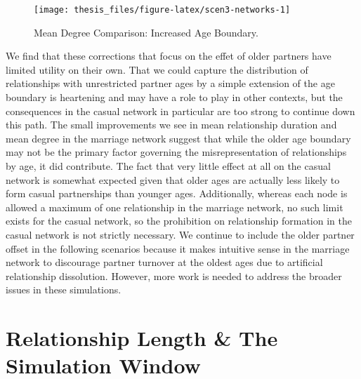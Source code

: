 \documentclass [11pt, proquest] {uwthesis}[2015/03/03]
\begin{document}
\begin{figure}

{\centering \texttt{[image: thesis\_files/figure-latex/scen3-networks-1]} 

}

\caption{Mean Degree Comparison: Increased Age Boundary.}\label{fig:scen3-networks}
\end{figure}
We find that these corrections that focus on the effet of older partners have limited utility on their own. That we could capture the distribution of relationships with unrestricted partner ages by a simple extension of the age boundary is heartening and may have a role to play in other contexts, but the consequences in the casual network in particular are too strong to continue down this path. The small improvements we see in mean relationship duration and mean degree in the marriage network suggest that while the older age boundary may not be the primary factor governing the misrepresentation of relationships by age, it did contribute. The fact that very little effect at all on the casual network is somewhat expected given that older ages are actually less likely to form casual partnerships than younger ages. Additionally, whereas each node is allowed a maximum of one relationship in the marriage network, no such limit exists for the casual network, so the prohibition on relationship formation in the casual network is not strictly necessary. We continue to include the older partner offset in the following scenarios because it makes intuitive sense in the marriage network to discourage partner turnover at the oldest ages due to artificial relationship dissolution. However, more work is needed to address the broader issues in these simulations.

\hypertarget{relationship-length-the-simulation-window}{%
\section{Relationship Length \& The Simulation Window}\label{relationship-length-the-simulation-window}}
\end{document}
